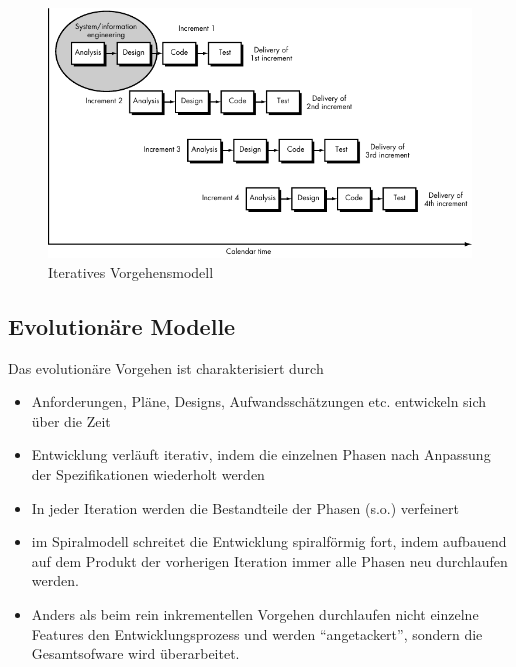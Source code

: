 \documentclass{scrartcl}
\begin{document}
\begin{figure}
   {\centering      
   \includegraphics[width=\textwidth]{incremental_pressman.pdf}
   \caption{Iteratives Vorgehensmodell}
   \label{iter}}
\end{figure}

\subsection{Evolutionäre Modelle}

Das evolutionäre Vorgehen ist charakterisiert durch
\begin{itemize}
   \item Anforderungen, Pläne, Designs, Aufwandsschätzungen etc. entwickeln sich
      über die Zeit
   \item Entwicklung verläuft iterativ, indem die einzelnen Phasen nach
      Anpassung der Spezifikationen wiederholt werden
   \item In jeder Iteration werden die Bestandteile der Phasen (s.o.) verfeinert 
   \item im Spiralmodell schreitet die Entwicklung spiralförmig fort, indem
      aufbauend auf dem Produkt der vorherigen Iteration immer alle Phasen neu
      durchlaufen werden.
   \item Anders als beim rein inkrementellen Vorgehen durchlaufen nicht einzelne
      Features den Entwicklungsprozess und werden ``angetackert'', sondern die
      Gesamtsofware wird überarbeitet.
\end{itemize}
\end{document}

